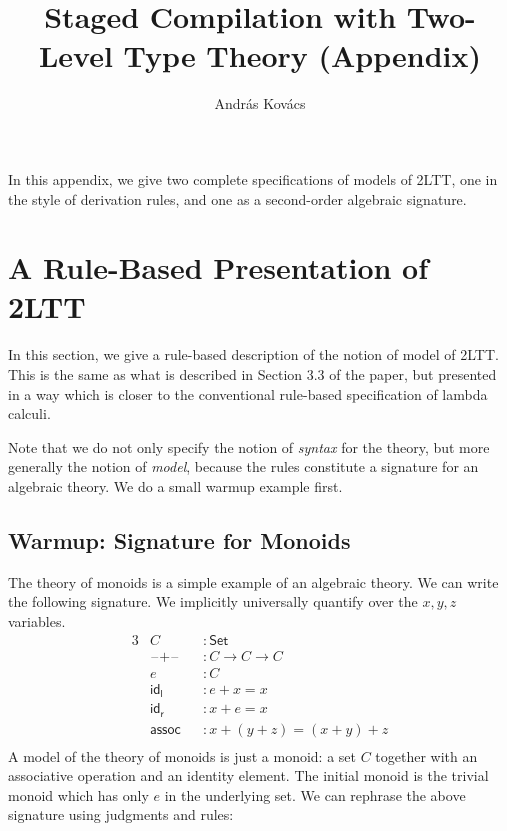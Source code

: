 \documentclass[acmsmall,screen,nonacm]{acmart}
\newcommand{\mit}[1]{\mathit{#1}}
\newcommand{\msf}[1]{\mathsf{#1}}
\newcommand{\Set}{\mathsf{Set}}
\newcommand{\blank}{{\mathord{\hspace{1pt}\text{--}\hspace{1pt}}}}
\theoremstyle{remark}
\begin{document}
\title{Staged Compilation with Two-Level Type Theory (Appendix)}

\author{András Kovács}

\maketitle

In this appendix, we give two complete specifications of models of 2LTT,
one in the style of derivation rules, and one as a second-order algebraic
signature.

\section{A Rule-Based Presentation of 2LTT}\label{sec:rules}

In this section, we give a rule-based description of the notion of model of
2LTT. This is the same as what is described in Section 3.3 of the paper, but
presented in a way which is closer to the conventional rule-based specification
of lambda calculi.

Note that we do not only specify the notion of \emph{syntax} for the theory, but
more generally the notion of \emph{model}, because the rules constitute a
signature for an algebraic theory. We do a small warmup example first.

\subsection{Warmup: Signature for Monoids}

The theory of monoids is a simple example of an algebraic theory. We can write the
following signature. We implicitly universally quantify over the $x,y,z$ variables.
\begin{alignat*}{3}
  & C &&: \Set \\
  & \blank\!+\blank\! &&: C \to C \to C\\
  & \mit{e} &&: C \\
  & \msf{id_l} &&: \mit{e} + x = x\\
  & \msf{id_r} &&: x + \mit{e} = x\\
  & \msf{assoc} &&: x + (y + z) = (x + y) + z\\
\end{alignat*}
A model of the theory of monoids is just a monoid: a set $C$ together with an
associative operation and an identity element. The initial monoid is the trivial
monoid which has only $\mit{e}$ in the underlying set. We can rephrase the above
signature using judgments and rules:
\end{document}
